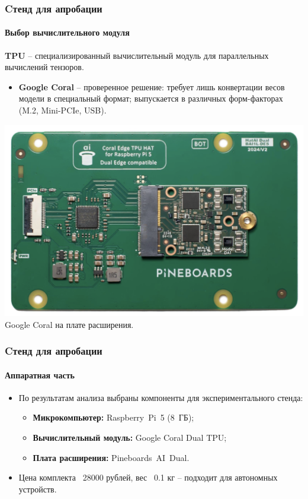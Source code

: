 \documentclass{beamer} %
\begin{document}
\begin{frame}
  \frametitle{Cтенд для апробации}
  \framesubtitle{Выбор вычислительного модуля}
  \textbf{TPU} -- специализированный вычислительный модуль для параллельных вычислений тензоров.
  \begin{itemize}
      \item \textbf{Google Coral} – проверенное решение: требует лишь конвертации весов модели в специальный формат; выпускается в различных форм-факторах (M.2, Mini-PCIe, USB).
  \end{itemize}
  \centering
  \includegraphics[width=0.5\linewidth]{images/presentation/tpu.png}\\
  \small Google Coral на плате расширения.
\end{frame}


\begin{frame}
  \frametitle{Cтенд для апробации}
  \framesubtitle{Аппаратная часть}
  \begin{itemize}
      \item По результатам анализа выбраны компоненты для экспериментального стенда:
      \begin{itemize}
          \item \textbf{Микрокомпьютер:} Raspberry Pi 5 (8 ГБ);
          \item \textbf{Вычислительный модуль:} Google Coral Dual TPU;
          \item \textbf{Плата расширения:} Pineboards AI Dual.
      \end{itemize}
      \item Цена комплекта ~28000 рублей, вес ~0.1 кг -- подходит для автономных устройств.
  \end{itemize}
\end{frame}
\end{document}
